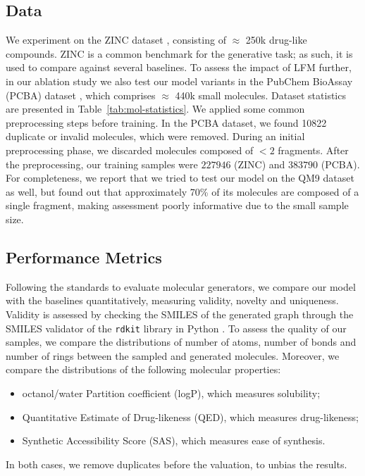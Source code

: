 \subsection{Data}
We experiment on the ZINC dataset \citep{irwin2005zinc}, consisting of $\approx$ 250k drug-like compounds. ZINC is a common benchmark for the generative task; as such, it is used to compare against several baselines. To assess the impact of LFM further, in our ablation study we also test our model variants in the PubChem BioAssay (PCBA) dataset  \citep{gindulyte2016pubchem}, which comprises $\approx$ 440k small molecules. Dataset statistics are presented in Table~\ref{tab:mol-statistics}. We applied some common preprocessing steps before training. In the PCBA dataset, we found 10822 duplicate or invalid molecules, which were removed. During an initial preprocessing phase, we discarded molecules composed of $< 2$ fragments. After the preprocessing, our training samples were $227946$ (ZINC) and $383790$ (PCBA). For completeness, we report that we tried to test our model on the QM9 dataset \citep{ramakrishnan2014qm9} as well, but found out that approximately 70\% of its molecules are composed of a single fragment, making assessment poorly informative due to the small sample size.


\subsection{Performance Metrics}
Following the standards to evaluate molecular generators, we compare our model with the baselines quantitatively, measuring validity, novelty and uniqueness. Validity is assessed by checking the SMILES of the generated graph through the SMILES validator of the \texttt{rdkit} library in Python \citep{rdkit}. To assess the quality of our samples, we compare the distributions of number of atoms, number of bonds and number of rings between the sampled and generated molecules. Moreover, we compare the distributions of the following molecular properties:
\begin{itemize}
    \item octanol/water Partition coefficient (logP), which measures solubility;
    \item Quantitative Estimate of Drug-likeness \citep{bickerton2012qed} (QED), which measures drug-likeness;
    \item Synthetic Accessibility Score \citep{ertl2009sas} (SAS), which measures ease of synthesis.
\end{itemize}
In both cases, we remove duplicates before the valuation, to unbias the results.

